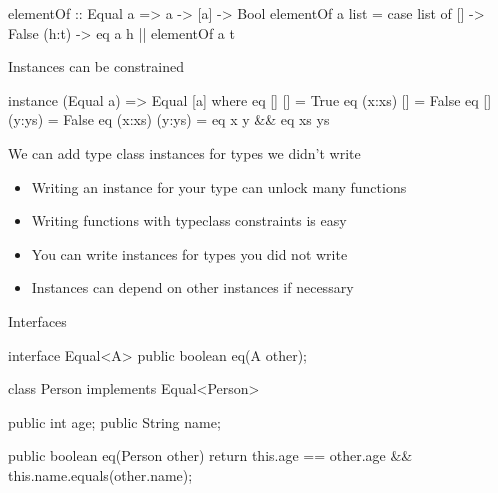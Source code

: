\documentclass[usenames,dvipsnames,svgnames,table,aspectratio=169,mathserif]{beamer}
\newcommand{\nl}{\vspace{\baselineskip}}
\newcommand{\pnl}{\pause \nl}
\begin{document}
\begin{frame}[fragile]
\begin{haskellcode}
elementOf :: Equal a => a -> [a] -> Bool
elementOf a list =
  case list of
    []    -> False
    (h:t) -> eq a h || elementOf a t
\end{haskellcode}
\end{frame}


\begin{frame}[fragile]
Instances can be constrained

\nl


\begin{haskellcode}
instance (Equal a) => Equal [a] where
  eq []     []     = True
  eq (x:xs) []     = False
  eq []     (y:ys) = False
  eq (x:xs) (y:ys) = eq x y && eq xs ys
\end{haskellcode}

\pnl

We can add type class instances for types we didn't write
\end{frame}


\begin{frame}

\begin{itemize}
\item Writing an instance for your type can unlock many functions
\item Writing functions with typeclass constraints is easy
\item You can write instances for types you did not write
\item Instances can depend on other instances if necessary
\end{itemize}

\end{frame}




\begin{frame}
\begin{center}
\huge{Interfaces}
\end{center}
\end{frame}


\begin{frame}[fragile]
\begin{javacode}
interface Equal<A> {
  public boolean eq(A other);
}
\end{javacode}

\pause

\begin{javacode}
class Person implements Equal<Person> {
  public int age;
  public String name;

  public boolean eq(Person other) {
    return this.age == other.age && this.name.equals(other.name);
  }
}
\end{javacode}
\end{frame}
\end{document}
